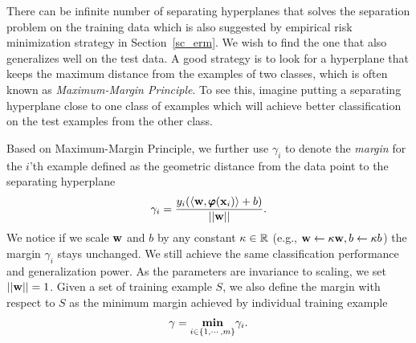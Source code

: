 {There can be infinite number of separating hyperplanes that solves the separation problem on the training data which is also suggested by empirical risk minimization strategy in Section~\ref{sc_erm}. 
We wish to find the one that also generalizes well on the test data.
A good strategy is to look for a hyperplane that keeps the maximum distance from the examples of two classes, which is often known as \textit{Maximum-Margin Principle}.
To see this, imagine putting a separating hyperplane close to one class of examples which will achieve better classification on the test examples from the other class.

Based on Maximum-Margin Principle, we further use $\gamma_i$ to denote the \textit{margin} for the $i$'th example defined as the geometric distance from the data point to the separating hyperplane
\begin{align*}
	\gamma_i = \frac{y_i(\langle \mathbf {w}, \pmb \varphi(\mathbf {x}_i) \rangle+b)}{\left|\left| \mathbf {w} \right|\right|}.
\end{align*}
We notice if we scale $\mathbf {w}$ and $b$ by any constant $\kappa\in\mathbb{R}$ (e.g., $\mathbf {w}\leftarrow\kappa\mathbf {w}, b\leftarrow\kappa b$) the margin $\gamma_i$ stays unchanged. 
We still achieve the same classification performance and generalization power.
As the parameters are invariance to scaling, we set $\left|\left| \mathbf {w} \right|\right|=1$.
Given a set of training example $S$, we also define the margin with respect to $S$ as the minimum margin achieved by individual training example
\begin{align*}
	\gamma = \underset{i\in\{1,\cdots,m\}}{\textbf{min}}\gamma_i.
\end{align*}

}
